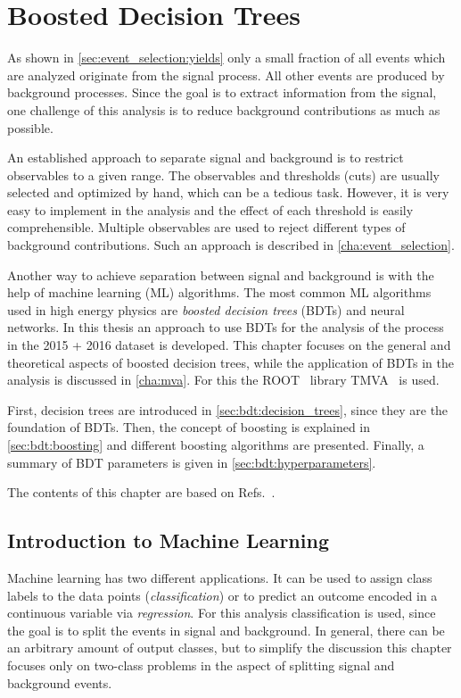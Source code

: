 \chapter{Boosted Decision Trees}\label{cha:bdt}

As shown in \cref{sec:event_selection:yields} only a small fraction of all events which are analyzed originate
from the signal process.
All other events are produced by background processes.
Since the goal is to extract information from the signal, one challenge of this analysis is to reduce
background contributions as much as possible.

An established approach to separate signal and background is to restrict observables to a given range.
The observables and thresholds (cuts) are usually selected and optimized by hand, which can be a tedious task.
However, it is very easy to implement in the analysis and the effect of each threshold is easily comprehensible.
Multiple observables are used to reject different types of background contributions.
Such an approach is described in \cref{cha:event_selection}.

Another way to achieve separation between signal and background is with the help of machine learning (ML) algorithms.
The most common ML algorithms used in high energy physics are \emph{boosted decision trees} (BDTs) and neural networks.
In this thesis an approach to use BDTs for the analysis of the \Httll{} process in the 2015 + 2016 dataset is developed.
This chapter focuses on the general and theoretical aspects of boosted decision trees, while the application of BDTs in the analysis
is discussed in \cref{cha:mva}. For this the ROOT~\cite{ROOT} library TMVA~\cite{TMVA} is used.

First, decision trees are introduced in \cref{sec:bdt:decision_trees}, since they are the foundation of BDTs.
Then, the concept of boosting is explained in \cref{sec:bdt:boosting} and different boosting algorithms are presented.
Finally, a summary of BDT parameters is given in \cref{sec:bdt:hyperparameters}.

The contents of this chapter are based on Refs.~\cite{Hastie2009,TMVA}.

\section{Introduction to Machine Learning}\label{sec:bdt:intro}

Machine learning has two different applications.
It can be used to assign class labels to the data points (\emph{classification}) or to predict
an outcome encoded in a continuous variable via \emph{regression}.
For this analysis classification is used, since the goal is to split the events in signal and background.
In general, there can be an arbitrary amount of output classes, but to simplify the discussion this chapter focuses
only on two-class problems in the aspect of splitting signal and background events.

